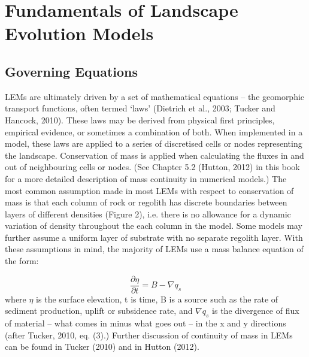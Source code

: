 \section{Fundamentals of Landscape Evolution Models}

\subsection{Governing Equations}

LEMs are ultimately driven by a set of mathematical equations – the geomorphic transport functions, often termed ‘laws’ (Dietrich et al., 2003; Tucker and Hancock, 2010). These laws may be derived from physical first principles, empirical evidence, or sometimes a combination of both. When implemented in a model, these laws are applied to a series of discretised cells or nodes representing the landscape. Conservation of mass is applied when calculating the fluxes in and out of neighbouring cells or nodes. (See Chapter 5.2 (Hutton, 2012) in this book for a more detailed description of mass continuity in numerical models.) The most common assumption made in most LEMs with respect to conservation of mass is that each column of rock or regolith has discrete boundaries between layers of different densities (Figure 2), i.e. there is no allowance for a dynamic variation of density throughout the each column in the model. Some models may further assume a uniform layer of substrate with no separate regolith layer. With these assumptions in mind, the majority of LEMs use a mass balance equation of the form:

\begin{equation*}
\frac{{\partial}\eta }{{\partial}t}=B-{\nabla}q_s
\end{equation*}
where $\eta $ is the surface elevation, t is time, B is a source such as the rate of sediment production, uplift or subsidence rate, and  ${\nabla}q_s$ is the divergence of flux of material – what comes in minus what goes out – in the x and y directions (after Tucker, 2010, eq. (3).) Further discussion of continuity of mass in LEMs can be found in Tucker (2010) and in Hutton (2012). 

